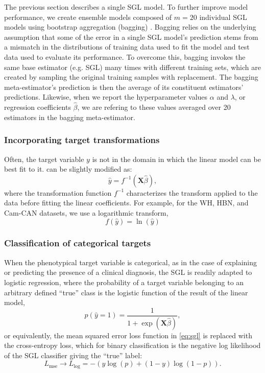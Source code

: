 \documentclass[10pt,%
               aps,%
               prl,%
               reprint,%
               superscriptaddress,%
               preprintnumbers,%
               linenumbers,%
               amsmath,%
               floatfix]{revtex4-2}
\begin{document}
The previous section describes a single SGL model. To further improve model
performance, we create ensemble models composed of $m = 20$ individual SGL
models using bootstrap aggregation (bagging) \cite{breiman1996bagging}.
Bagging relies on the underlying assumption that some of the error in a
single SGL model's prediction stems from a mismatch in the distributions of
training data used to fit the model and test data used to evaluate its
performance. To overcome this, bagging invokes the same base estimator (e.g.
SGL) many times with different training sets, which are created by sampling
the original training samples with replacement. The bagging meta-estimator's
prediction is then the average of its constituent estimators' predictions.
Likewise, when we report the hyperparameter values $\alpha$ and $\lambda$, or
regression coefficients $\hat{\beta}$, we are refering to these values
averaged over 20 estimators in the bagging meta-estimator.

\subsubsection{Incorporating target transformations}

Often, the target variable $y$ is not in the domain in which the linear
model can be best fit to it.  can be slightly
modified as:
\begin{equation}
    \hat{y} = f^{-1} \left( \mathbf{X} \hat{\beta} \right),
    \label{eq:lm-transform}
\end{equation}
where the transformation function $f^{-1}$ characterizes the transform
applied to the data before fitting the linear coefficients. For example,
for the WH, HBN, and Cam-CAN datasets, we use a logarithmic transform,
\begin{equation}
    f \left( \hat{y} \right) = \ln \left( \hat{y} \right)
    \label{eq:log-nonlinearity}
\end{equation}

\subsubsection{Classification of categorical targets}
When the phenotypical target variable is categorical, as in the case of
explaining or predicting the presence of a clinical diagnosis, the SGL is
readily adapted to logistic regression, where the probability of a target
variable belonging to an arbitrary defined ``true'' class is the logistic
function of the result of the linear model,
\begin{equation}
    p(\hat{y} = 1) = \frac{1}{1 + \exp(\mathbf{X} \hat{\beta})},
    \label{eq:logit}
\end{equation}
or equivalently, the mean squared error loss function in \cref{eq:sgl} is
replaced with the cross-entropy loss, which for binary classification is the
negative log likelihood of the SGL classifier giving the ``true'' label:
\begin{equation}
    L_{\text{mse}} \rightarrow L_{\log} =
    -\left(y \log(p) + (1 - y) \log(1 - p)\right).
    \label{eq:logloss}
\end{equation}
\end{document}
